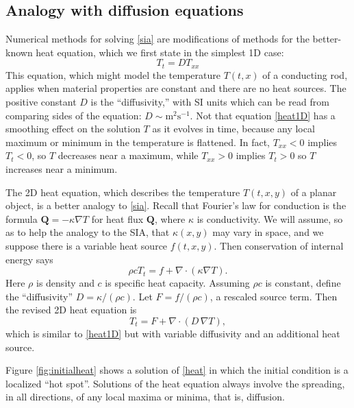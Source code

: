 \documentclass[letterpaper,final,12pt,reqno]{amsart}
\newcommand{\grad}{\nabla}
\newcommand{\Div}{\nabla\cdot}
\begin{document}
\subsection*{Analogy with diffusion equations}  Numerical methods for solving \eqref{sia} are modifications of methods for the better-known heat equation, which we first state in the simplest 1D case:
\begin{equation}
T_t = D T_{xx} \label{heat1D}
\end{equation}
This equation, which might model the temperature $T(t,x)$ of a conducting rod, applies when material properties are constant and there are no heat sources.  The positive constant $D$ is the ``diffusivity,'' with SI units which can be read from comparing sides of the equation: $D\sim \text{m}^2 \text{s}^{-1}$.  Not that equation \eqref{heat1D} has a smoothing effect on the solution $T$ as it evolves in time, because any local maximum or minimum in the temperature is flattened.  In fact, $T_{xx}<0$ implies $T_t<0$, so $T$ decreases near a maximum, while $T_{xx}>0$ implies $T_t>0$ so $T$ increases near a minimum.

The 2D heat equation, which describes the temperature $T(t,x,y)$ of a planar object, is a better analogy to \eqref{sia}.  Recall that Fourier's law for conduction is the formula $\mathbf{Q} = - \kappa \grad T$ for heat flux $\mathbf{Q}$, where $\kappa$ is conductivity.  We will assume, so as to help the analogy to the SIA, that $\kappa(x,y)$ may vary in space, and we suppose there is a variable heat source $f(t,x,y)$.  Then conservation of internal energy says
\begin{equation}
\rho c T_t = f + \Div (\kappa \grad T). \label{heatearly}
\end{equation}
Here $\rho$ is density and $c$ is specific heat capacity.  Assuming $\rho c$ is constant, define the ``diffusivity'' $D=\kappa/(\rho c)$.  Let $F = f/(\rho c)$, a rescaled source term.  Then the revised 2D heat equation is
\begin{equation}
T_t = F + \Div (D\, \grad T), \label{heat}
\end{equation}
which is similar to \eqref{heat1D} but with variable diffusivity and an additional heat source.

Figure \ref{fig:initialheat} shows a solution of \eqref{heat} in which the initial condition is a localized ``hot spot''.  Solutions of the heat equation always involve the spreading, in all directions, of any local maxima or minima, that is, diffusion.
\end{document}
